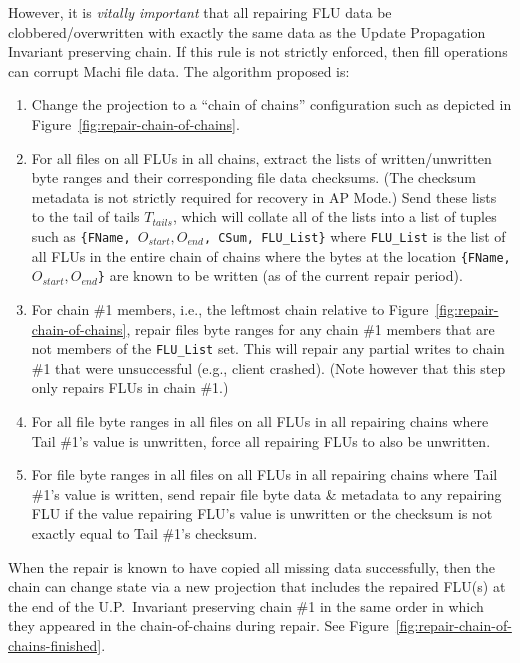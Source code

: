 \documentclass[preprint,10pt]{sigplanconf}
\begin{document}
However, it is {\em vitally important} that all repairing FLU data be
clobbered/overwritten with exactly the same data as the Update
Propagation Invariant preserving chain.  If this rule is not strictly
enforced, then fill operations can corrupt Machi file data.  The
algorithm proposed is:

\begin{enumerate}

\item Change the projection to a ``chain of chains'' configuration
  such as depicted in Figure~\ref{fig:repair-chain-of-chains}.

\item For all files on all FLUs in all chains, extract the lists of
  written/unwritten byte ranges and their corresponding file data
  checksums.  (The checksum metadata is not strictly required for
  recovery in AP Mode.)
  Send these lists to the tail of tails
  $T_{tails}$, which will collate all of the lists into a list of
  tuples such as {\tt \{FName, $O_{start}, O_{end}$, CSum, FLU\_List\}}
  where {\tt FLU\_List} is the list of all FLUs in the entire chain of
  chains where the bytes at the location {\tt \{FName, $O_{start},
    O_{end}$\}} are known to be written (as of the current repair period).

\item For chain \#1 members, i.e., the
  leftmost chain relative to Figure~\ref{fig:repair-chain-of-chains},
  repair files byte ranges for any chain \#1 members that are not members
  of the {\tt FLU\_List} set.  This will repair any partial
  writes to chain \#1 that were unsuccessful (e.g., client crashed).
  (Note however that this step only repairs FLUs in chain \#1.)

\item For all file byte ranges in all files on all FLUs in all
  repairing chains where Tail \#1's value is unwritten, force all
  repairing FLUs to also be unwritten.

\item For file byte ranges in all files on all FLUs in all repairing
  chains where Tail \#1's value is written, send repair file byte data
  \& metadata to any repairing FLU if the value repairing FLU's
  value is unwritten or the checksum is not exactly equal to Tail \#1's
  checksum.

\end{enumerate}

When the repair is known to have copied all missing data successfully,
then the chain can change state via a new projection that includes the
repaired FLU(s) at the end of the U.P.~Invariant preserving chain \#1
in the same order in which they appeared in the chain-of-chains during
repair.  See Figure~\ref{fig:repair-chain-of-chains-finished}.
\end{document}

